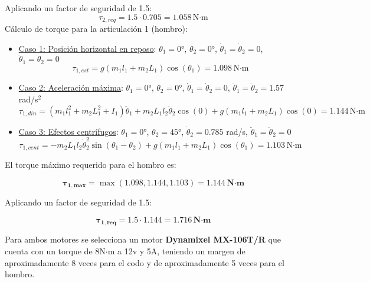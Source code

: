 Aplicando un factor de seguridad de 1.5:
\begin{equation}
\tau_{2,req} = 1.5 \cdot 0.705 = 1.058 \, \text{N·m}
\end{equation}
Cálculo de torque para la articulación 1 (hombro):
\begin{itemize}
    \item \underline{Caso 1: Posición horizontal en reposo}: $\theta_1 = 0°$, $\theta_2 = 0°$, $\dot{\theta}_1 = \dot{\theta}_2 = 0$, $\ddot{\theta}_1 = \ddot{\theta}_2 = 0$ \\
        
        \begin{equation}
        \tau_{1,est} = g(m_1l_1 + m_2L_1)\cos(\theta_1) 
        = 1.098 \, \text{N·m}
        \end{equation}

    \item \underline{Caso 2: Aceleración máxima}: $\theta_1 = 0°$, $\theta_2 = 0°$, $\dot{\theta}_1 = \dot{\theta}_2 = 0$, $\ddot{\theta}_1 = \ddot{\theta}_2 = 1.57$ rad/s$^2$\\
        
        \begin{equation}
        \tau_{1,din} = (m_1l_1^2 + m_2L_1^2 + I_1)\ddot{\theta}_1 + m_2L_1l_2\ddot{\theta}_2\cos(0) + g(m_1l_1 + m_2L_1)\cos(0) = 1.144 \, \text{N·m}
        \end{equation}

    \item \underline{Caso 3: Efectos centrífugos}: $\theta_1 = 0°$, $\theta_2 = 45°$, $\dot{\theta}_2 = 0.785$ rad/s, $\ddot{\theta}_1 = \ddot{\theta}_2 = 0$\\
        
        \begin{equation}
        \tau_{1,cent} = - m_2L_1l_2\dot{\theta}_2^2\sin(\theta_1 - \theta_2) + g(m_1l_1 + m_2L_1)\cos(\theta_1)
        = 1.103 \, \text{N·m}
        \end{equation}
\end{itemize}

El torque máximo requerido para el hombro es:

\begin{equation}
\mathbf{\tau_{1,max}} = \max(1.098, 1.144, 1.103) = \mathbf{1.144 \, \textbf{N·m} }
\end{equation}

Aplicando un factor de seguridad de 1.5:

\begin{equation}
\mathbf{\tau_{1,req}} = 1.5 \cdot 1.144 = \mathbf{1.716 \, \textbf{N·m} }
\end{equation}

Para ambos motores se selecciona un motor \textbf{Dynamixel MX-106T/R} que cuenta con un torque de 8N$\cdot$m a 12v y 5A, teniendo un margen de aproximadamente 8 veces para el codo y de aproximadamente 5 veces para el hombro.
